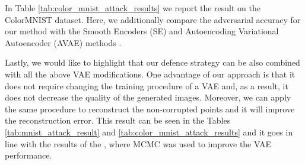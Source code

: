 {In Table \ref{tab:color_mnist_attack_results} we report the result on the ColorMNIST dataset. Here, we additionally compare the adversarial accuracy for our method with the Smooth Encoders (SE) and Autoencoding Variational Autoencoder (AVAE) methods \cite{cemgil2020autoencoding, Cemgil2019-vn}.

Lastly, we would like to highlight that our defence strategy can be also combined with all the above VAE modifications. One advantage of our approach is that it does not require changing the training procedure of a VAE and, as a result, it does not decrease the quality of the generated images. 
Moreover, we can apply the same procedure to reconstruct the non-corrupted points and it will improve the reconstruction error. 
This result can be seen in the Tables \ref{tab:mnist_attack_result} and \ref{tab:color_mnist_attack_results} and it goes in line with the results of the \cite{salimans2015markov}, where MCMC was used to improve the VAE performance. 


 


}
